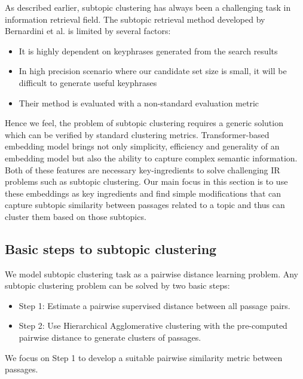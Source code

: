 As described earlier, subtopic clustering has always been a challenging task in information retrieval field. The subtopic retrieval method developed by Bernardini et al. is limited by several factors: 
\begin{itemize}[leftmargin=.15in]
    \item It is highly dependent on keyphrases generated from the search results
    \item In high precision scenario where our candidate set size is small, it will be difficult to generate useful keyphrases
    \item Their method is evaluated with a non-standard evaluation metric
\end{itemize}
Hence we feel, the problem of subtopic clustering requires a generic solution which can be verified by standard clustering metrics. Transformer-based embedding model brings not only simplicity, efficiency and generality of an embedding model but also the ability to capture complex semantic information. Both of these features are necessary key-ingredients to solve challenging IR problems such as subtopic clustering. Our main focus in this section is to use these embeddings as key ingredients and find simple modifications that can capture subtopic similarity between passages related to a topic and thus can cluster them based on those subtopics.

\subsection{Basic steps to subtopic clustering} We model subtopic clustering task as a pairwise distance learning problem. Any subtopic clustering problem can be solved by two basic steps:
\begin{itemize}[leftmargin=.15in]
    \item Step 1: Estimate a pairwise supervised distance between all passage pairs.
    \item Step 2: Use Hierarchical Agglomerative clustering with the pre-computed pairwise distance to generate clusters of passages.
\end{itemize}

We focus on Step 1 to develop a suitable pairwise similarity metric between passages.

